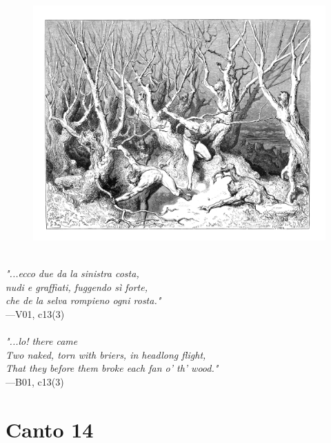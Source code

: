 \documentclass[../Dore_vision.tex]{subfiles}
\begin{document}
\begin{figure}[ht]
\centering
\includegraphics[height=\figsize]{illustrations/book_1/V01, c13(3).jpg}
\end{figure}

\begin{center}
\begin{minipage}{0.8\linewidth}
\textit{\\
"...ecco due da la sinistra costa,\\nudi e graffiati, fuggendo sì forte,\\che de la selva rompieno ogni rosta."} \\
—V01, c13(3) \\~\\
\textit{"...lo! there came\\Two naked, torn with briers, in headlong flight,\\That they before them broke each fan o' th' wood."} \\
—B01, c13(3)
\end{minipage}
\end{center}

\newpage

\section{Canto 14}
\end{document}
